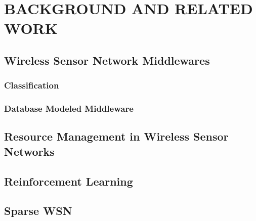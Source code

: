 \chapter{BACKGROUND AND RELATED WORK}

\section{Wireless Sensor Network Middlewares}

\subsection{Classification}

\subsection{Database Modeled Middleware}

\subsection{}

\section{Resource Management in Wireless Sensor
Networks}


\section{Reinforcement Learning}

\section{Sparse WSN}
